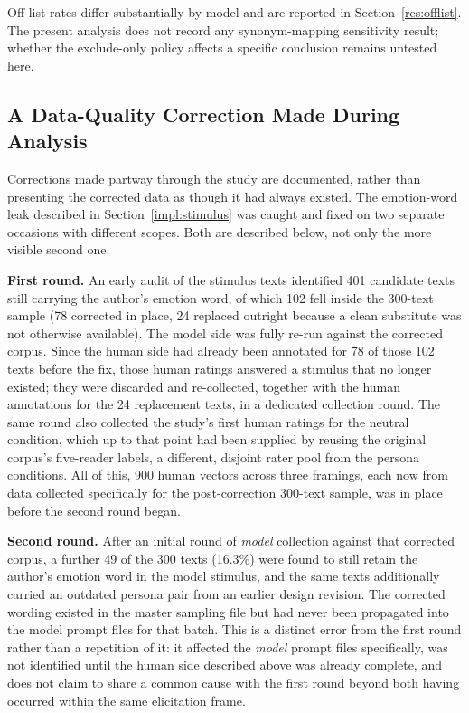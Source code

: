 Off-list rates differ substantially by model and are reported in Section~\ref{res:offlist}. The
present analysis does not record any synonym-mapping sensitivity result; whether the exclude-only
policy affects a specific conclusion remains untested here.

\subsection{A Data-Quality Correction Made During Analysis}
\label{impl:leak}

\noindent
Corrections made partway through the study are documented, rather than presenting the corrected
data as though it had always existed. The emotion-word leak described in
Section~\ref{impl:stimulus} was caught and fixed on two separate occasions with different scopes.
Both are described below, not only the more visible second one.

\textbf{First round.} An early audit of the stimulus texts identified 401 candidate texts still
carrying the author's emotion word, of which 102 fell inside the 300-text sample (78 corrected in
place, 24 replaced outright because a clean substitute was not otherwise available). The model
side was fully re-run against the corrected corpus. Since the human side had already been
annotated for 78 of those 102 texts before the fix, those human ratings answered a stimulus that
no longer existed; they were discarded and re-collected, together with the human annotations for
the 24 replacement texts, in a dedicated collection round. The same round also collected the
study's first human ratings for the neutral condition, which up to that point had been supplied
by reusing the original corpus's five-reader labels, a different, disjoint rater pool from the
persona conditions. All of this, 900 human vectors across three framings, each now from data
collected specifically for the post-correction 300-text sample, was in place before the second
round began.

\textbf{Second round.} After an initial round of \emph{model} collection against that corrected
corpus, a further 49 of the 300 texts (16.3\%) were found to still retain the author's emotion word
in the model stimulus, and the same texts additionally carried an outdated persona pair from an
earlier design revision. The corrected wording existed in the master sampling file but had never
been propagated into the model prompt files for that batch. This is a distinct error from the
first round rather than a repetition of it: it affected the \emph{model} prompt files
specifically, was not identified until the human side described above was already complete, and
does not claim to share a common cause with the first round beyond both having occurred within
the same elicitation frame.

